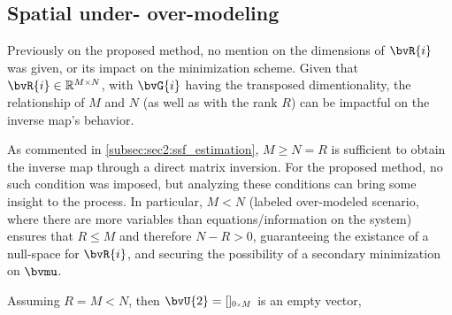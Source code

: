 \subsection{Spatial under- over-modeling}

Previously on the proposed method, no mention on the dimensions of $\bvR{i}$ was given, or its impact on the minimization scheme. Given that $\bvR{i} \in \re^{\sz{M}{N}}$, with $\bvG{i}$ having the transposed dimentionality, the relationship of $M$ and $N$ (as well as with the rank $R$) can be impactful on the inverse map's behavior.

As commented in \cref{subsec:sec2:ssf_estimation}, $M \geq N=R$ is sufficient to obtain the inverse map through a direct matrix inversion. For the proposed method, no such condition was imposed, but analyzing these conditions can bring some insight to the process. In particular, $M < N$ (labeled over-modeled scenario, where there are more variables than equations/information on the system) ensures that $R \leq M$ and therefore $N - R > 0$, guaranteeing the existance of a null-space for $\bvR{i}$, and securing the possibility of a secondary minimization on $\bvmu$.

Assuming $R = M < N$, then $\bvU{2} = []\SubSize{0}{M}$ is an empty vector, 


